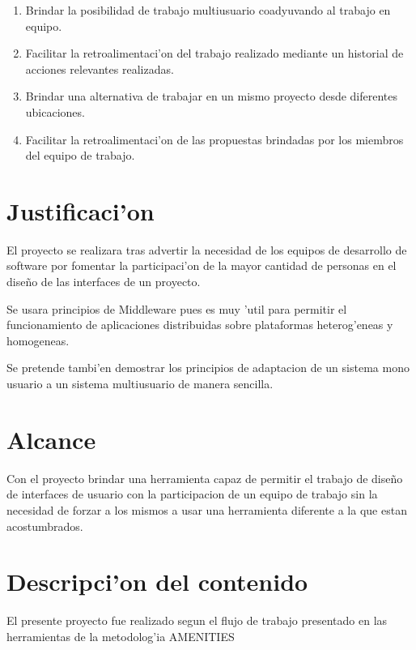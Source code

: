 \begin{enumerate}
	\item Brindar la posibilidad de trabajo multiusuario coadyuvando al trabajo en equipo.
	\item Facilitar la retroalimentaci'on del trabajo realizado mediante un historial de acciones relevantes realizadas. 
	\item Brindar una alternativa de trabajar en un mismo proyecto desde diferentes ubicaciones.
	\item Facilitar la retroalimentaci'on de las propuestas brindadas por los miembros del equipo de trabajo.
\end{enumerate}

\section{Justificaci'on}

El proyecto se realizara tras advertir la necesidad de los equipos de desarrollo de software por fomentar la participaci'on de la mayor cantidad de personas en el dise\~no de las interfaces de un proyecto.

Se usara principios de Middleware pues es muy 'util para permitir el funcionamiento de aplicaciones distribuidas sobre plataformas heterog'eneas y homogeneas.

Se pretende tambi'en demostrar los principios de adaptacion de un sistema mono usuario a un sistema multiusuario de manera sencilla. 

\section{Alcance}

Con el proyecto brindar una herramienta capaz de permitir el trabajo de dise\~no de interfaces de usuario con la participacion de un equipo de trabajo sin la necesidad de forzar a los mismos a usar una herramienta diferente a la que estan acostumbrados.

\section{Descripci'on del contenido}

El presente proyecto fue realizado segun el flujo de trabajo presentado en las herramientas de la metodolog'ia AMENITIES
